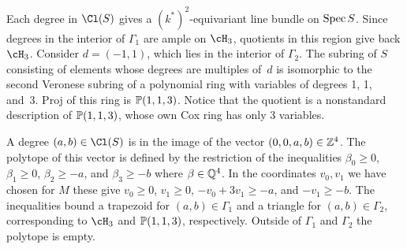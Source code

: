 \documentclass{article}
\begin{document}
\begin{example}
\begin{center}
  \end{center}

  Each degree in $\Cl(S)$ gives a $(k^*)^2$-equivariant line bundle on $\operatorname{Spec} S$.  Since degrees in the interior of $\Gamma_1$ are ample on $\cH_3$, quotients in this region give back $\cH_3$.  Consider $d=(-1,1)$, which lies in the interior of $\Gamma_2$.  The subring of $S$ consisting of elements whose degrees are multiples of~$d$ is isomorphic to the second Veronese subring of a polynomial ring with variables of degrees 1, 1, and~3.  Proj of this ring is $\mathbb P(1,1,3)$.  Notice that the quotient is a nonstandard description of $\mathbb P(1,1,3)$, whose own Cox ring has only 3 variables.

  A degree $(a,b)\in\Cl(S)$ is in the image of the vector $(0,0,a,b)\in \mathbb Z^4$.  The polytope of this vector is defined by the restriction of the inequalities $\beta_0\geq 0$, $\beta_1\geq 0$, $\beta_2\geq -a$, and $\beta_3\geq -b$ where $\beta\in\mathbb Q^4$.  In the coordinates $v_0,v_1$ we have chosen for $M$ these give $v_0\geq 0$, $v_1\geq 0$, $-v_0+3v_1\geq -a$, and $-v_1\geq -b$.  The inequalities bound a trapezoid for $(a,b)\in\Gamma_1$ and a triangle for $(a,b)\in\Gamma_2$, corresponding to $\cH_3$ and $\mathbb P(1,1,3)$, respectively.  Outside of $\Gamma_1$ and $\Gamma_2$ the polytope is empty.

  \begin{center}
  \end{center}


\end{example}
\end{document}
